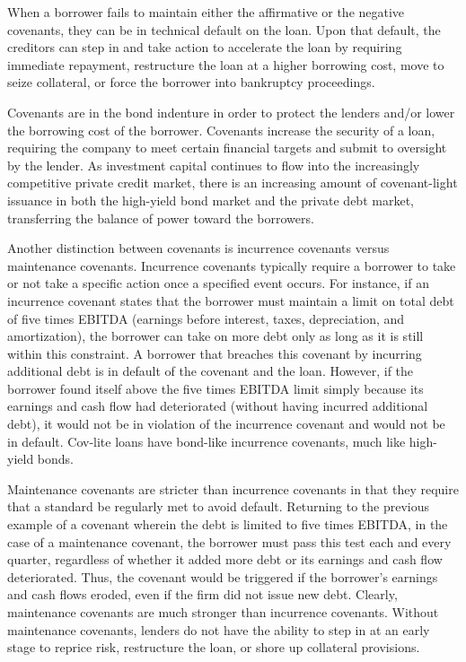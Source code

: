 \documentclass[11pt]{article}
\begin{document}
When a borrower fails to maintain either the affirmative or the negative covenants, they can be in technical default on the loan. Upon that default, the creditors can step in and take action to accelerate the loan by requiring immediate repayment, restructure the loan at a higher borrowing cost, move to seize collateral, or force the borrower into bankruptcy proceedings.

Covenants are in the bond indenture in order to protect the lenders and/or lower the borrowing cost of the borrower. Covenants increase the security of a loan, requiring the company to meet certain financial targets and submit to oversight by the lender. As investment capital continues to flow into the increasingly\\
competitive private credit market, there is an increasing amount of covenant-light issuance in both the high-yield bond market and the private debt market, transferring the balance of power toward the borrowers.

Another distinction between covenants is incurrence covenants versus maintenance covenants. Incurrence covenants typically require a borrower to take or not take a specific action once a specified event occurs. For instance, if an incurrence covenant states that the borrower must maintain a limit on total debt of five times EBITDA (earnings before interest, taxes, depreciation, and amortization), the borrower can take on more debt only as long as it is still within this constraint. A borrower that breaches this covenant by incurring additional debt is in default of the covenant and the loan. However, if the borrower found itself above the five times EBITDA limit simply because its earnings and cash flow had deteriorated (without having incurred additional debt), it would not be in violation of the incurrence covenant and would not be in default. Cov-lite loans have bond-like incurrence covenants, much like high-yield bonds.

Maintenance covenants are stricter than incurrence covenants in that they require that a standard be regularly met to avoid default. Returning to the previous example of a covenant wherein the debt is limited to five times EBITDA, in the case of a maintenance covenant, the borrower must pass this test each and every quarter, regardless of whether it added more debt or its earnings and cash flow deteriorated. Thus, the covenant would be triggered if the borrower's earnings and cash flows eroded, even if the firm did not issue new debt. Clearly, maintenance covenants are much stronger than incurrence covenants. Without maintenance covenants, lenders do not have the ability to step in at an early stage to reprice risk, restructure the loan, or shore up collateral provisions.
\end{document}
